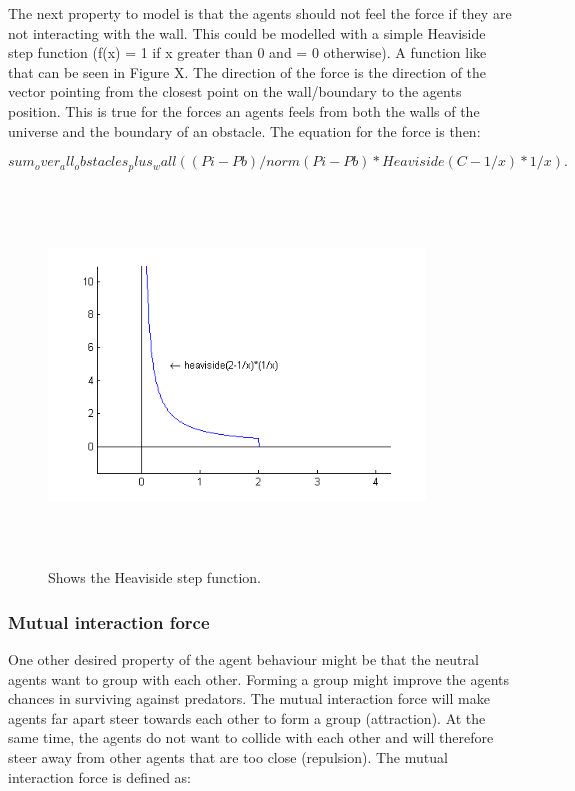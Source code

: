 \documentclass[paper=a4, fontsize=11pt,twoside]{scrartcl}		%
\begin{document}
\begin{flushleft}
The next property to model is that the agents should not feel the force if they are not interacting with the wall. This could be modelled with a simple Heaviside step function (f(x) = 1 if x greater than 0 and = 0 otherwise). A function like that can be seen in Figure X. The direction of the force is the direction of the vector pointing from the closest point on the wall/boundary to the agents position. This is true for the forces an agents feels from both the walls of the universe and the boundary of an obstacle. The equation for the force is then:

$$sum_over_all_obstacles_plus_wall((Pi-Pb)/norm(Pi-Pb)*Heaviside(C-1/x)*1/x).$$


\begin{figure}
\begin{center}
\includegraphics[height=10cm,width=10cm]{heavisideOneDividedByX}
\caption{Shows the Heaviside step function.}
\label{tab:heaviside}
\end{center}
\end{figure}

\subsubsection{Mutual interaction force}

One other desired property of the agent behaviour might be that the neutral agents want to group with each other. Forming a group might improve the agents chances in surviving against predators. The mutual interaction force will make agents far apart steer towards each other to form a group (attraction). At the same time, the agents do not want to collide with each other and will therefore steer away from other agents that are too close (repulsion). The mutual interaction force is defined as:


\end{flushleft}
\end{document}

